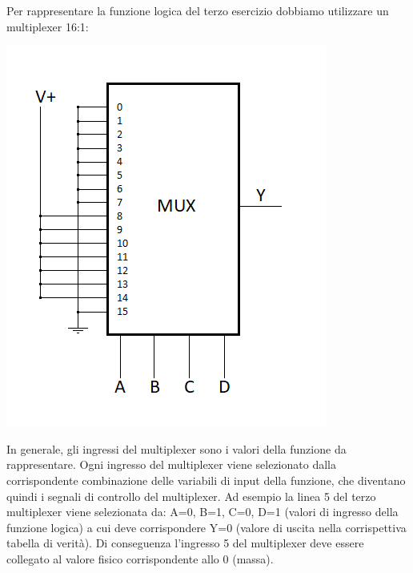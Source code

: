 \documentclass[tikz, border=2mm]{article}
\begin{document}
\begin{enumerate}
\begin{center}
\end{center}
Per rappresentare la funzione logica del terzo esercizio dobbiamo utilizzare un multiplexer 16:1:
\begin{center} 
    \includegraphics{mux3.png}
\end{center}
In generale, gli ingressi del multiplexer sono i valori della funzione da rappresentare. Ogni ingresso del multiplexer viene selezionato dalla corrispondente combinazione delle variabili di input della funzione, che diventano quindi i segnali di controllo del multiplexer. Ad esempio la linea 5 del terzo multiplexer viene selezionata da: A=0, B=1, C=0, D=1 (valori di ingresso della funzione logica) a cui deve corrispondere Y=0 (valore di uscita nella corrispettiva tabella di verità). Di conseguenza l'ingresso 5 del multiplexer deve essere collegato al valore fisico corrispondente allo 0 (massa). \\

\end{enumerate}
\end{document}
